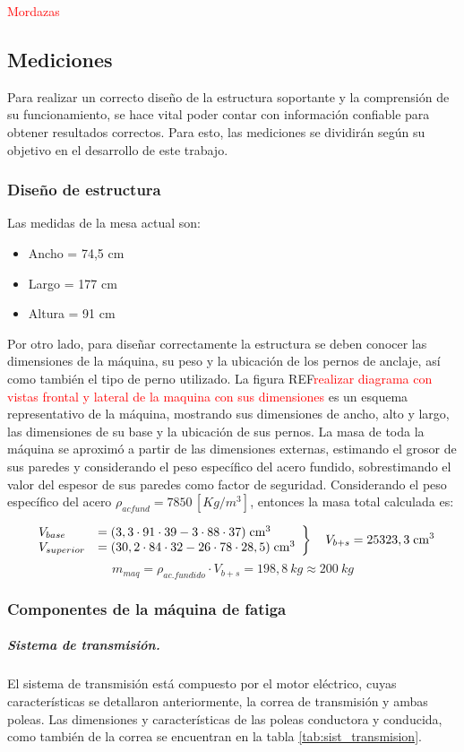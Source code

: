 \textcolor{red}{Mordazas}
\subsection{Mediciones}
Para realizar un correcto diseño de la estructura soportante y la comprensión de su funcionamiento, se hace vital poder contar con información confiable para obtener resultados correctos. Para esto, las mediciones se dividirán según su objetivo en el desarrollo de este trabajo.
\subsubsection{Diseño de estructura}
Las medidas de la mesa actual son: 
\begin{itemize}
	\item Ancho = 74,5 cm
	\item Largo = 177 cm
	\item Altura = 91 cm
\end{itemize}
Por otro lado, para diseñar correctamente la estructura se deben conocer las dimensiones de la máquina, su peso y la ubicación de los pernos de anclaje, así como también el tipo de perno utilizado. La figura REF\textcolor{red}{realizar diagrama con vistas frontal y lateral de la maquina con sus dimensiones} es un esquema representativo de la máquina, mostrando sus dimensiones de ancho, alto y largo, las dimensiones de su base y la ubicación de sus pernos. La masa de toda la máquina se aproximó a partir de las dimensiones externas, estimando el grosor de sus paredes y considerando el peso específico del acero fundido, sobrestimando el valor del espesor de sus paredes como factor de seguridad. Considerando el peso específico del acero $\rho_{acfund} = 7850 \, [Kg/m^3]$, entonces la masa total calculada es:

\[ \left. 
\begin{array}{ll}
V_{base} &= (3,3\cdot 91\cdot 39 - 3\cdot 88\cdot 37)\; \text{cm}^3	\\
V_{superior} &=(30,2\cdot 84\cdot 32 - 26\cdot 78\cdot 28,5) \; \text{cm}^3	\\
\end{array}
\right\} \\
\quad V_{b+s} = 25323,3 \; \text{cm}^3 \]
\begin{equation}
	m_{maq} = \rho_{ac. fundido} \cdot V_{b+s} = 198,8 \: kg \approx 200 \: kg
\end{equation}

\subsubsection{Componentes de la máquina de fatiga}
\subparagraph{Sistema de transmisión.}
El sistema de transmisión está compuesto por el motor eléctrico, cuyas características se detallaron anteriormente, la correa de transmisión y ambas poleas. Las dimensiones y características de las poleas conductora y conducida, como también de la correa se encuentran en la tabla \ref{tab:sist_transmision}. 

